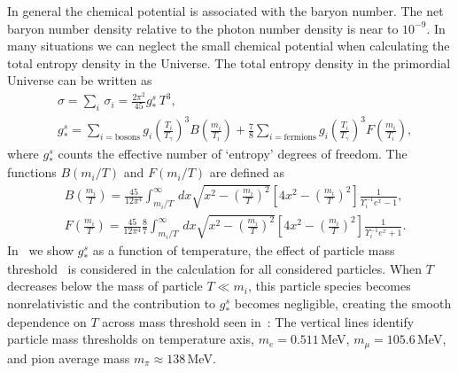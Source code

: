 In general the chemical potential is associated with the baryon number. The net baryon number density relative to the photon number density is near to $10^{-9}$. In many situations we can neglect the small chemical potential when calculating the total entropy density in the Universe. The total entropy density in the primordial Universe can be written as
\begin{align}
&\sigma=\sum_i\,\sigma_i=\frac{2\pi^2}{45}g^s_\ast\,T^3,\\
&g^s_\ast=\sum_{i=\mathrm{bosons}}g_i\left({\frac{T_i}{T_\gamma}}\right)^3B\left(\frac{m_i}{T_i}\right)+\frac{7}{8}\sum_{i=\mathrm{fermions}}g_i\left({\frac{T_i}{T_\gamma}}\right)^3F\left(\frac{m_i}{T_i}\right),
\end{align}
where $g^s_\ast$ counts the effective number of `entropy' degrees of freedom. The functions $B(m_i/T)$ and $F(m_i/T)$ are defined as 
\begin{align}
&B\left(\frac{m_i}{T}\right)=\frac{45}{12\pi^4}\int^\infty_{m_i/T}\,dx\sqrt{x^2-\left(\frac{m_i}{T}\right)^2}\left[4x^2-\left(\frac{m_i}{T}\right)^2\right]\frac{1}{\Upsilon^{-1}_ie^x-1},\\
&F\left(\frac{m_i}{T}\right)=\frac{45}{12\pi^4}\frac{8}{7}\int^\infty_{m_i/T}\,dx\sqrt{x^2-\left(\frac{m_i}{T}\right)^2}\left[4x^2-\left(\frac{m_i}{T}\right)^2\right]\frac{1}{\Upsilon^{-1}_ie^x+1}.
\end{align}
In~ we show $g^s_\ast$ as a function of temperature, the effect of particle mass threshold~\cite{Coc:2006rt} is considered in the calculation for all considered particles. When $T$ decreases below the mass of particle $T\ll m_i$, this particle species becomes nonrelativistic and the contribution to $g^s_\ast$ becomes negligible, creating the smooth dependence on $T$ across mass threshold seen in~: The vertical lines identify particle mass thresholds on temperature axis, $m_e=0.511$\,MeV, $m_\mu=105.6$\,MeV, and pion average mass $m_\pi\approx138$\,MeV.

